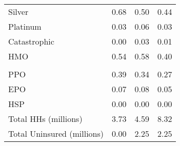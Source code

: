 \begin{tabular}{lrrr}
\hspace{1em}Silver & 0.68 & 0.50 & 0.44\\
\hspace{1em}Platinum & 0.03 & 0.06 & 0.03\\
\hspace{1em}Catastrophic & 0.00 & 0.03 & 0.01\\
\hspace{1em}HMO & 0.54 & 0.58 & 0.40\\
\addlinespace[0.3em]
\multicolumn{4}{l}{\textbf{Network Type}}\\
\hspace{1em}PPO & 0.39 & 0.34 & 0.27\\
\hspace{1em}EPO & 0.07 & 0.08 & 0.05\\
\hspace{1em}HSP & 0.00 & 0.00 & 0.00\\
\hspace{1em}Total HHs (millions) & 3.73 & 4.59 & 8.32\\
Total Uninsured (millions) & 0.00 & 2.25 & 2.25\\
\bottomrule
\end{tabular}
